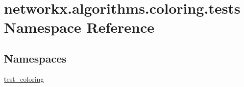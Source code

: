 \hypertarget{namespacenetworkx_1_1algorithms_1_1coloring_1_1tests}{}\section{networkx.\+algorithms.\+coloring.\+tests Namespace Reference}
\label{namespacenetworkx_1_1algorithms_1_1coloring_1_1tests}
\subsection*{Namespaces}
\begin{DoxyCompactItemize}
\item 
 \hyperlink{namespacenetworkx_1_1algorithms_1_1coloring_1_1tests_1_1test__coloring}{test\+\_\+coloring}
\end{DoxyCompactItemize}
